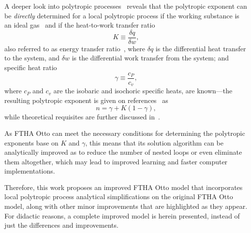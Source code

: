     A deeper look into polytropic processes~\cite{2012-ChristiansJ-IntJMechEngEduc, 2020-NaaktgeborenC-Polytropic-engrXiv-rev02}
    reveals that the polytropic exponent can be \emph{directly} determined  for  a  local  polytropic  process  if  the  working
    substance is an ideal gas~\cite{2020-NaaktgeborenC-Polytropic-engrXiv-rev02} and if the heat-to-work transfer ratio%
    \begin{equation}
        K \equiv \frac{\delta q}{\delta w},
        \label{eq:def.K}
    \end{equation}
    \noindent also referred to as  energy  transfer  ratio~\cite{2012-ChristiansJ-IntJMechEngEduc},  where  $\delta  q$  is  the
    differential heat transfer to the system, and $\delta w$ is the differential work transfer from  the  system;  and  specific
    heat ratio%
    \begin{equation}
        \gamma \equiv \frac{c_P}{c_v},
        \label{eq:def.gamma}
    \end{equation}
    \noindent where $c_P$ and $c_v$ are the isobaric and isochoric specific heats, are known---the resulting polytropic exponent
    is   given   on   references~\cite{2012-ChristiansJ-IntJMechEngEduc,   2020-NaaktgeborenC-Polytropic-engrXiv-rev02} as%
    \begin{equation}
        n = \gamma + K(1 - \gamma),
        \label{eq:n}
    \end{equation}
    \noindent while theoretical requisites are further discussed in~\cite{2020-NaaktgeborenC-Polytropic-engrXiv-rev02}.

    As FTHA Otto can meet the necessary conditions for determining the polytropic exponents base on $K$ and $\gamma$, this means
    that its solution algorithm can be analytically improved as to reduce the number of nested  loops  or  even  eliminate  them
    altogether, which may lead to improved learning and faster computer implementations.

    Therefore, this  work  proposes  an  improved  FTHA  Otto  model  that  incorporates  local  polytropic  process  analytical
    simplifications on the original FTHA Otto model, along with other minor improvements that are highlighted  as  they  appear.
    For didactic reasons, a complete improved model is herein presented, instead of just the differences and improvements.



